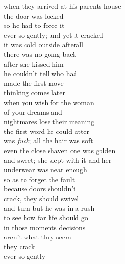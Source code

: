 when they arrived at his parents house\\
the door was locked\\
so he had to force it\\
ever so gently; and yet it cracked\\
it was cold outside afterall\\
there was no going back\\
after she kissed him\\

he couldn't tell who had\\
made the first move\\
thinking comes later\\
when you wish for the woman\\
of your dreams and\\
nightmares lose their meaning\\
the first word he could utter\\
was \textit{fuck}; all the hair was soft\\
even the close shaven one was golden\\
and sweet; she slept with it and her\\
underwear was near enough\\
so as to forget the fault\\

because doors shouldn't\\
crack, they should swivel\\
and turn but he was in a rush\\
to see how far life should go\\
in those moments decisions\\
aren't what they seem\\
they crack\\
ever so gently
